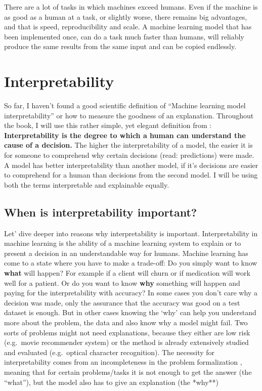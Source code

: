\documentclass[12pt,]{krantz}
\theoremstyle{definition}
\theoremstyle{definition}
\theoremstyle{definition}
\theoremstyle{remark}
\begin{document}
There are a lot of tasks in which machines exceed humans. Even if the
machine is as good as a human at a task, or slightly worse, there
remains big advantages, and that is speed, reproducibility and scale. A
machine learning model that has been implemented once, can do a task
much faster than humans, will reliably produce the same results from the
same input and can be copied endlessly.

\chapter{Interpretability}\label{interpretability}

So far, I haven't found a good scientific definition of ``Machine
learning model interpretability'' or how to measure the goodness of an
explanation. Throughout the book, I will use this rather simple, yet
elegant definition from \citet{miller2017explanation}:
\textbf{Interpretability is the degree to which a human can understand the cause of a decision.}
The higher the interpretability of a model, the easier it is for someone
to comprehend why certain decisions (read: predictions) were made. A
model has better interpretability than another model, if it's decisions
are easier to comprehend for a human than decisions from the second
model. I will be using both the terms interpretable and explainable
equally.

\section{When is interpretability
important?}\label{when-is-interpretability-important}

Let' dive deeper into reasons why interpretability is important.
Interpretability in machine learning is the ability of a machine
learning system to explain or to present a decision in an understandable
way for humans. Machine learning has come to a state where you have to
make a trade-off: Do you simply want to know \textbf{what} will happen?
For example if a client will churn or if medication will work well for a
patient. Or do you want to know \textbf{why} something will happen and
paying for the interpretability with accuracy? In some cases you don't
care why a decision was made, only the assurance that the accuracy was
good on a test dataset is enough. But in other cases knowing the `why'
can help you understand more about the problem, the data and also know
why a model might fail. Two sorts of problems might not need
explanations, because they either are low risk (e.g.~movie recommender
system) or the method is already extensively studied and evaluated
(e.g.~optical character recognition). The necessity for interpretability
comes from an incompleteness in the problem formalization
\citep{Doshi-Velez2017}, meaning that for certain problems/tasks it is
not enough to get the answer (the ``what''), but the model also has to
give an explanation (the *why**)
\end{document}
